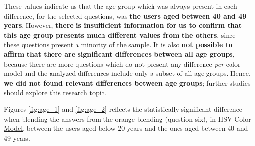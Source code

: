 %
These values indicate us that the age group which was always present in each difference, for the selected questions, was \textbf{the users aged between 40 and 49 years}. However, \textbf{there is insufficient information for us to confirm that this age group presents much different values
from the others}, since these questions present a minority of the sample. It is also \textbf{not possible to affirm that there are significant differences between all age groups}, because there are more questions which do not present any difference \emph{per} color model and the analyzed
differences include only a subset of all age groups. Hence, \textbf{we did not found relevant differences between age groups}; further studies should explore this research topic. \par
%
Figures \ref{fig:age_1} and \ref{fig:age_2} reflects the statistically significant difference when blending the answers from the orange blending (question six), in \ul{HSV Color Model}, between the users aged below 20 years and the ones aged between 40 and 49 years.
%
